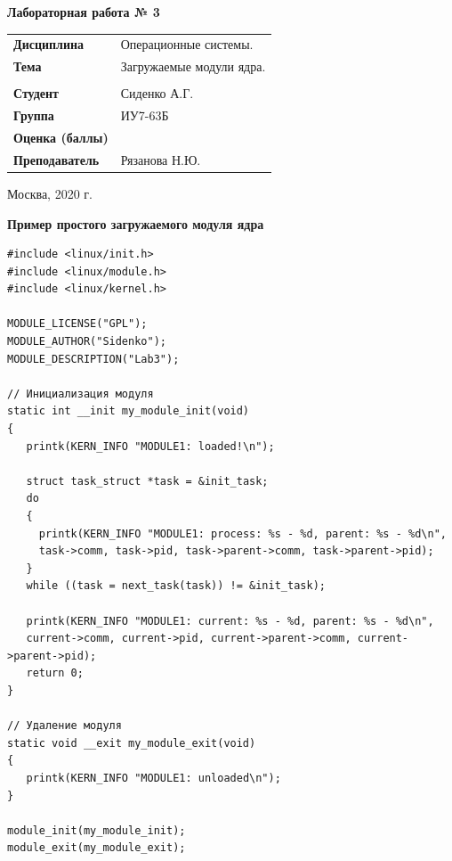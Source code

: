 \documentclass[a4paper,14pt]{extreport} %
\begin{document}
\begin{titlepage}
    \vspace{2cm}

    \begin{center}
        \textbf{Лабораторная работа № 3} \\
        \vspace{0.5cm}
    \end{center}

    \vspace{4cm}

    \begin{flushleft}
        \begin{tabular}{ll}
            \textbf{Дисциплина} & Операционные системы.  \\
            \textbf{Тема} & Загружаемые модули ядра.  \\
            \\
            \textbf{Студент} & Сиденко А.Г. \\
            \textbf{Группа} & ИУ7-63Б \\
            \textbf{Оценка (баллы)} & \\
            \textbf{Преподаватель} & Рязанова Н.Ю.   \\
        \end{tabular}
    \end{flushleft}

    \vspace{4cm}

   \begin{center}
        Москва, 2020 г.
    \end{center}

\end{titlepage}

\textbf{Пример простого загружаемого модуля ядра} 

\begin{lstlisting}
#include <linux/init.h>
#include <linux/module.h>
#include <linux/kernel.h>

MODULE_LICENSE("GPL");
MODULE_AUTHOR("Sidenko");
MODULE_DESCRIPTION("Lab3");

// Инициализация модуля
static int __init my_module_init(void)
{
   printk(KERN_INFO "MODULE1: loaded!\n");

   struct task_struct *task = &init_task;
   do
   {
     printk(KERN_INFO "MODULE1: process: %s - %d, parent: %s - %d\n",
     task->comm, task->pid, task->parent->comm, task->parent->pid);
   }
   while ((task = next_task(task)) != &init_task);

   printk(KERN_INFO "MODULE1: current: %s - %d, parent: %s - %d\n",
   current->comm, current->pid, current->parent->comm, current->parent->pid);
   return 0;
}

// Удаление модуля
static void __exit my_module_exit(void)
{
   printk(KERN_INFO "MODULE1: unloaded\n");
}

module_init(my_module_init);
module_exit(my_module_exit);
\end{lstlisting}
\end{document}
